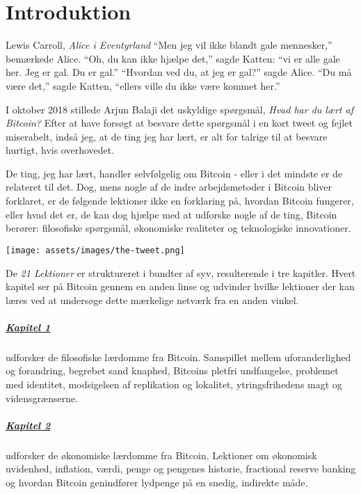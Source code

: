 \chapter*{Introduktion}
\label{ch:introduktion}

\begin{chapquote}{Lewis Carroll, \textit{Alice i Eventyrland}}
\enquote{Men jeg vil ikke blandt gale mennesker,} bemærkede Alice. 
\enquote{Oh, du kan ikke hjælpe det,} sagde Katten: \enquote{vi er alle gale 
her. Jeg er gal. Du er gal.} \enquote{Hvordan ved du, at jeg er gal?} sagde 
Alice. \enquote{Du må være det,} sagde Katten, \enquote{ellers ville du ikke
være kommet her.}
\end{chapquote}

I oktober 2018 stillede Arjun Balaji det uskyldige spørgsmål,
\textit{Hvad har du lært af Bitcoin?} Efter at have forsøgt at besvare dette
spørgsmål i en kort tweet og fejlet miserabelt, indså jeg, at de ting
jeg har lært, er alt for talrige til at besvare hurtigt, hvis overhovedet.

De ting, jeg har lært, handler selvfølgelig om Bitcoin - eller i det mindste 
er de relateret til det. Dog, mens nogle af de indre arbejdsmetoder i Bitcoin 
bliver forklaret, er de følgende lektioner ikke en forklaring på, hvordan 
Bitcoin fungerer, eller hvad det er, de kan dog hjælpe med at udforske nogle 
af de ting, Bitcoin berører: filosofiske spørgsmål, økonomiske realiteter og 
teknologiske innovationer.

\begin{center}
  \texttt{[image: assets/images/the-tweet.png]}
\end{center}

De \textit{21 Lektioner} er struktureret i bundter af syv, resulterende i tre
kapitler. Hvert kapitel ser på Bitcoin gennem en anden linse og udvinder
hvilke lektioner der kan læres ved at undersøge dette mærkelige netværk fra en 
anden vinkel.

\paragraph{\hyperref[ch:philosophy]{Kapitel 1}}{ udforsker de filosofiske
lærdomme fra Bitcoin. Samspillet mellem uforanderlighed og forandring, begrebet
sand knaphed, Bitcoins pletfri undfangelse, problemet med identitet,
modsigelsen af replikation og lokalitet, ytringsfrihedens magt og
vidensgrænserne.}

\paragraph{\hyperref[ch:economics]{Kapitel 2}}{ udforsker de økonomiske lærdomme
fra Bitcoin. Lektioner om økonomisk uvidenhed, inflation, værdi, penge og
pengenes historie, fractional reserve banking og hvordan Bitcoin genindfører
lydpenge på en snedig, indirekte måde.}

